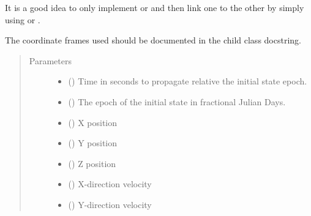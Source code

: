 \documentclass[letterpaper,10pt,english]{sphinxmanual}
\begin{document}
\begin{fulllineitems}
\begin{fulllineitems}
It is a good idea to only implement {\hyperref[\detokenize{modules/propagator_base:propagator_base.PropagatorBase.get_orbit}]{}} or {\hyperref[\detokenize{modules/propagator_base:propagator_base.PropagatorBase.get_orbit_cart}]{}} and then link one to the other by simply using {\hyperref[\detokenize{modules/dpt_tools:dpt_tools.kep2cart}]{}} or {\hyperref[\detokenize{modules/dpt_tools:dpt_tools.cart2kep}]{}}.

The coordinate frames used should be documented in the child class docstring.
\begin{quote}\begin{description}
\item[{Parameters}] \leavevmode\begin{itemize}
\item {} 
 () \textendash{} Time in seconds to propagate relative the initial state epoch.

\item {} 
 () \textendash{} The epoch of the initial state in fractional Julian Days.

\item {} 
 () \textendash{} X position

\item {} 
 () \textendash{} Y position

\item {} 
 () \textendash{} Z position

\item {} 
 () \textendash{} X-direction velocity

\item {} 
 () \textendash{} Y-direction velocity


\end{itemize}
\end{description}
\end{quote}
\end{fulllineitems}
\end{fulllineitems}
\end{document}

